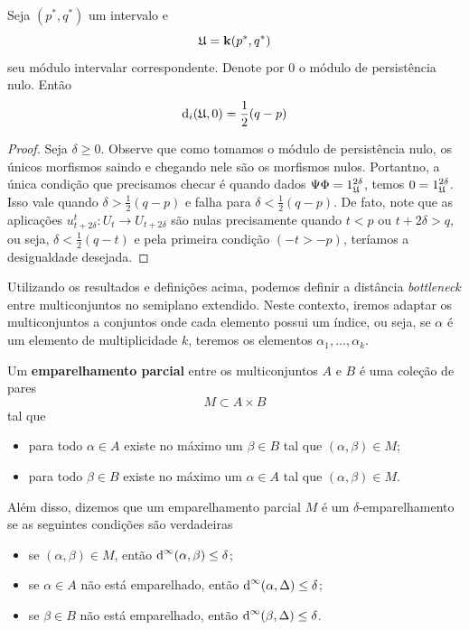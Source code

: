 \begin{propo}\label{teo:semint_eq}
    Seja $(p^*, q^*)$ um intervalo e 
    \begin{equation*}
        \mathfrak{U} = \mathbf{k}(p^*, q^*)
    \end{equation*}
    seu módulo intervalar correspondente. Denote por $0$ o módulo de persistência
    nulo. Então
    \begin{equation*}
        \text{d}_i(\mathfrak{U}, 0) = \frac{1}{2}(q-p)
    \end{equation*}
\end{propo}
\begin{proof}
    Seja $\delta \geq 0$. Observe que como tomamos o módulo de persistência nulo, os únicos
    morfismos saindo e chegando nele são os morfismos nulos. Portantno, a única condição
    que precisamos checar é quando dados $\Psi\Phi = 1^{2\delta}_{\mathfrak{U}}$, temos 
    $0 = 1^{2\delta}_{\mathfrak{U}}$. Isso vale quando $\delta > \frac{1}{2} (q-p)$ e falha 
    para $\delta < \frac{1}{2}(q-p)$. De fato, note que as aplicações $u^t_{t+2\delta} \colon
    U_t \to U_{t+2\delta}$ são nulas precisamente quando $t < p$ ou $t + 2\delta > q$, ou seja,
    $\delta < \frac{1}{2}(q-t)$ e pela primeira condição $(-t > -p)$, teríamos a desigualdade desejada. 
\end{proof}

Utilizando os resultados e definições acima, podemos definir a distância \textit{bottleneck} entre 
multiconjuntos no semiplano extendido. Neste contexto, iremos adaptar os multiconjuntos 
a conjuntos onde cada elemento possui um índice, ou seja, se $\alpha$ é um elemento de 
multiplicidade $k$, teremos os elementos $\alpha_1, \dots, \alpha_k$. 

\begin{defi}
    Um \textbf{emparelhamento parcial} entre os multiconjuntos $A$ e $B$ é uma coleção de pares
    \begin{equation*}
        M \subset A \times B
    \end{equation*}
    tal que
    \begin{itemize}
        \item para todo $\alpha \in A$ existe no máximo um $\beta \in B$ tal que $(\alpha, \beta)
        \in M$;
        \item para todo $\beta \in B$ existe no máximo um $\alpha \in A$ tal que 
        $(\alpha, \beta) \in M$.
    \end{itemize}
    Além disso, dizemos que um emparelhamento parcial $M$ é um $\delta$-emparelhamento se 
    as seguintes condições são verdadeiras
    \begin{itemize}
        \item se $(\alpha, \beta) \in M$, então $\text{d}^\infty(\alpha, \beta) \leq \delta$; 
        \item se $\alpha \in A$ não está emparelhado, então $\text{d}^\infty(\alpha, \Delta) \leq \delta$;
        \item se $\beta \in B$ não está emparelhado, então $\text{d}^\infty(\beta, \Delta) \leq \delta$.
    \end{itemize}
\end{defi}

